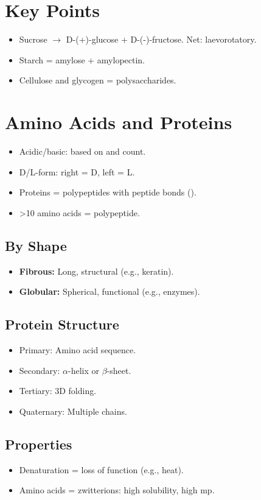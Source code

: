 \documentclass[12pt]{article}
\begin{document}
\section*{Key Points}
\begin{itemize}
  \item Sucrose $\rightarrow$ D-(+)-glucose + D-(-)-fructose. Net: laevorotatory.
  \item Starch = amylose + amylopectin.
  \item Cellulose and glycogen = polysaccharides.
\end{itemize}

\section*{Amino Acids and Proteins}
\begin{itemize}
  \item Acidic/basic: based on  and  count.
  \item D/L-form:  right = D, left = L.
  \item Proteins = polypeptides with peptide bonds ().
  \item >10 amino acids = polypeptide.
\end{itemize}

\subsection*{By Shape}
\begin{itemize}
  \item \textbf{Fibrous:} Long, structural (e.g., keratin).
  \item \textbf{Globular:} Spherical, functional (e.g., enzymes).
\end{itemize}

\subsection*{Protein Structure}
\begin{itemize}
  \item Primary: Amino acid sequence.
  \item Secondary: $\alpha$-helix or $\beta$-sheet.
  \item Tertiary: 3D folding.
  \item Quaternary: Multiple chains.
\end{itemize}

\subsection*{Properties}
\begin{itemize}
  \item Denaturation = loss of function (e.g., heat).
  \item Amino acids = zwitterions: high solubility, high mp.
\end{itemize}
\end{document}

